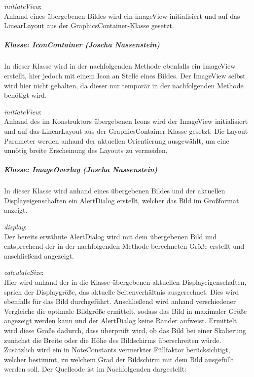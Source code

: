 \textit{initiateView}:\\
Anhand eines übergebenen Bildes wird ein imageView initialisiert und auf das LinearLayout aus der GraphicsContainer-Klasse gesetzt.

\subparagraph{Klasse: IconContainer (Joscha Nassenstein)}
In dieser Klasse wird in der nachfolgenden Methode ebenfalls ein ImageView erstellt, hier jedoch mit einem Icon an Stelle eines Bildes. Der ImageView selbst wird hier nicht gehalten, da dieser nur temporär in der nachfolgenden Methode benötigt wird.

\textit{initiateView}:\\
Anhand des im Konstruktors übergebenen Icons wird der ImageView initialisiert und auf das LinearLayout aus der GraphicsContainer-Klasse gesetzt. Die Layout-Parameter werden anhand der aktuellen Orientierung ausgewählt, um eine unnötig breite Erscheinung des Layouts zu vermeiden.

\subparagraph{Klasse: ImageOverlay (Joscha Nassenstein)}
In dieser Klasse wird anhand eines übergebenen Bildes und der aktuellen Displayeigenschaften ein AlertDialog erstellt, welcher das Bild im Großformat anzeigt.

\textit{display}:\\
Der bereits erwähnte AlertDialog wird mit dem übergebenen Bild und entsprechend der in der nachfolgenden Methode berechneten Größe erstellt und anschließend angezeigt.

\textit{calculateSize}:\\
Hier wird anhand der in die Klasse übergebenen aktuellen Displayeigenschaften, sprich der Displaygröße, das aktuelle Seitenverhältnis ausgerechnet. Dies wird ebenfalls für das Bild durchgeführt. Anschließend wird anhand verschiedener Vergleiche die optimale Bildgröße ermittelt, sodass das Bild in maximaler Größe angezeigt werden kann und der AlertDialog keine Ränder aufweist. Ermittelt wird diese Größe dadurch, dass überprüft wird, ob das Bild bei einer Skalierung zunächst die Breite oder die Höhe des Bildschirms überschreiten würde. Zusätzlich wird ein in NoteConstants vermerkter Füllfaktor berücksichtigt, welcher bestimmt, zu welchem Grad der Bildschirm mit dem Bild ausgefüllt werden soll.
Der Quellcode ist im Nachfolgenden dargestellt: 


